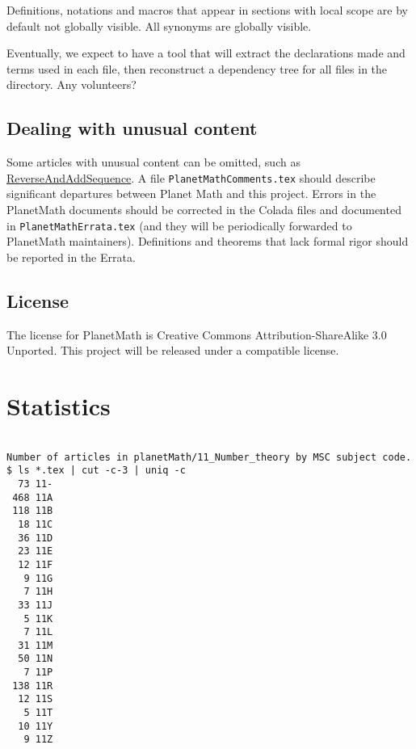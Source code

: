 \documentclass[12pt]{article}
\numberwithin{definition}{section}
\begin{document}
Definitions, notations and macros that appear in sections with local scope are by default not globally visible.
All synonyms are globally visible. 

Eventually, we expect to have a tool that will extract the declarations made and terms used in each file,
then reconstruct a dependency tree for all files in the directory.  Any volunteers?

\subsection{Dealing with unusual content} Some articles with unusual content can be omitted, such as 
 \href{11B99-196sReverseAndAddSequenceTo1000Terms.tex}{ReverseAndAddSequence}.  A file
  {\tt PlanetMathComments.tex} should describe significant departures
  between Planet Math and this project.
  Errors in the PlanetMath documents should be corrected in the Colada files
  and documented in {\tt PlanetMathErrata.tex} 
  (and
  they will be periodically forwarded to PlanetMath maintainers).
  Definitions and theorems that lack formal rigor should be reported in the Errata.  


\subsection{License}

The license for PlanetMath is Creative Commons Attribution-ShareAlike 3.0 Unported.
This project will be released under a compatible license.

\section{Statistics}

\begin{verbatim}

Number of articles in planetMath/11_Number_theory by MSC subject code.
$ ls *.tex | cut -c-3 | uniq -c
  73 11-
 468 11A
 118 11B
  18 11C
  36 11D
  23 11E
  12 11F
   9 11G
   7 11H
  33 11J
   5 11K
   7 11L
  31 11M
  50 11N
   7 11P
 138 11R
  12 11S
   5 11T
  10 11Y
   9 11Z
\end{verbatim}
\end{document}
